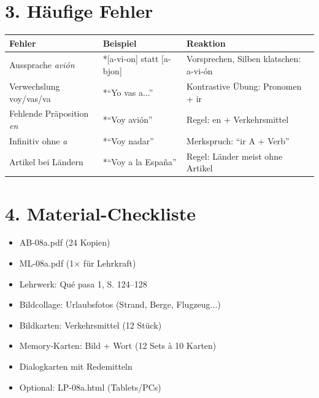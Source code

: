 \documentclass[11pt, a4paper]{article}
\begin{document}
\section*{3. Häufige Fehler}

\begin{fehlerbox}
\begin{tabularx}{\textwidth}{|l|X|X|}
\hline
\textbf{Fehler} & \textbf{Beispiel} & \textbf{Reaktion} \\
\hline
Aussprache \textit{avión} & *[a-vi-on] statt [a-bjon] & Vorsprechen, Silben klatschen: a-vi-ón \\
\hline
Verwechslung voy/vas/va & *``Yo vas a...'' & Kontrastive Übung: Pronomen + ir \\
\hline
Fehlende Präposition \textit{en} & *``Voy avión'' & Regel: en + Verkehrsmittel \\
\hline
Infinitiv ohne \textit{a} & *``Voy nadar'' & Merkspruch: ``ir A + Verb'' \\
\hline
Artikel bei Ländern & *``Voy a la España'' & Regel: Länder meist ohne Artikel \\
\hline
\end{tabularx}
\end{fehlerbox}


\section*{4. Material-Checkliste}

\begin{materialbox}
\begin{itemize}[label=$\square$]
    \item AB-08a.pdf (24 Kopien)
    \item ML-08a.pdf (1× für Lehrkraft)
    \item Lehrwerk: Qué pasa 1, S. 124--128
    \item Bildcollage: Urlaubsfotos (Strand, Berge, Flugzeug...)
    \item Bildkarten: Verkehrsmittel (12 Stück)
    \item Memory-Karten: Bild + Wort (12 Sets à 10 Karten)
    \item Dialogkarten mit Redemitteln
    \item Optional: LP-08a.html (Tablets/PCs)
\end{itemize}
\end{materialbox}
\end{document}
